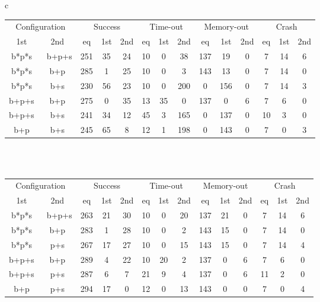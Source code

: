 \documentclass[envcountsame]{llncs}
\begin{document}
\begin{figure}[!htb]
\begin{center}
\begin{tabular}{c}
\begin{tabular}{|cc||ccc|ccc|ccc|ccc|}
\hline
\multicolumn{2}{|c||}{Configuration} &
\multicolumn{3}{c|}{Success} &
\multicolumn{3}{c|}{Time-out} &
\multicolumn{3}{c|}{Memory-out} &
\multicolumn{3}{c|}{Crash}
\\
1st & 2nd &
eq & 1st & 2nd &
eq & 1st & 2nd &
eq & 1st & 2nd &
eq & 1st & 2nd
\\ \hline
b*p*s & ~b+p+s &
251 & 35 & 24 & 
10 & 0 & 38 & 
137 & 19 & 0 & 
7 & 14 & 6
\\
b*p*s & b+p &
285 & 1 & 25 & 
10 & 0 & 3 & 
143 & 13 & 0 & 
7 & 14 & 0
\\
b*p*s & b+s &
230 & 56 & 23 & 
10 & 0 & 200 & 
0 & 156 & 0 & 
7 & 14 & 3
\\
b+p+s & b+p &
275 & 0 & 35 & 
13 & 35 & 0 & 
137 & 0 & 6 & 
7 & 6 & 0
\\
b+p+s & b+s &
241 & 34 & 12 & 
45 & 3 & 165 & 
0 & 137 & 0 & 
10 & 3 & 0
\\
b+p & b+s &
245 & 65 & 8 & 
12 & 1 & 198 & 
0 & 143 & 0 & 
7 & 0 & 3
\\
\hline
\end{tabular}
 \\ \\
\begin{tabular}{|cc||ccc|ccc|ccc|ccc|}
\hline
\multicolumn{2}{|c||}{Configuration} &
\multicolumn{3}{c|}{Success} &
\multicolumn{3}{c|}{Time-out} &
\multicolumn{3}{c|}{Memory-out} &
\multicolumn{3}{c|}{Crash}
\\
1st & 2nd &
eq & 1st & 2nd &
eq & 1st & 2nd &
eq & 1st & 2nd &
eq & 1st & 2nd
\\ \hline
b*p*s & ~b+p+s &
263 & 21 & 30 & 
10 & 0 & 20 & 
137 & 21 & 0 & 
7 & 14 & 6
\\
b*p*s & b+p &
283 & 1 & 28 & 
10 & 0 & 2 & 
143 & 15 & 0 & 
7 & 14 & 0
\\
b*p*s & p+s &
267 & 17 & 27 & 
10 & 0 & 15 & 
143 & 15 & 0 & 
7 & 14 & 4
\\
b+p+s & b+p &
289 & 4 & 22 & 
10 & 20 & 2 & 
137 & 0 & 6 & 
7 & 6 & 0
\\
b+p+s & p+s &
287 & 6 & 7 & 
21 & 9 & 4 & 
137 & 0 & 6 & 
11 & 2 & 0
\\
b+p & p+s &
294 & 17 & 0 & 
12 & 0 & 13 & 
143 & 0 & 0 & 
7 & 0 & 4
\\
\hline
\end{tabular}
 \\ \\

\end{tabular}
\end{center}
\end{figure}
\end{document}

